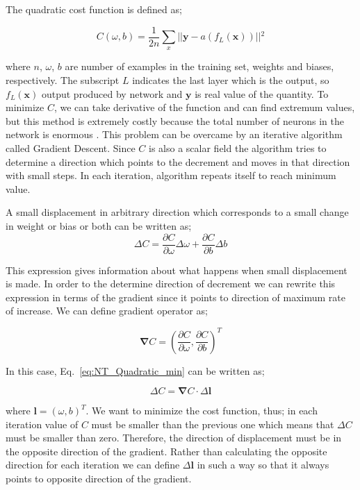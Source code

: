 \documentclass[a4paper,times,hidelinks,12pt]{article}
\begin{document}
The quadratic cost function is defined as;

\begin{equation}
\label{eq:NT_Quadratic}
C(\omega, b) = \frac{1}{2n} \sum\limits_{x} || \boldsymbol{y} - a(f_L(\boldsymbol{x})) ||{^2} 
\end{equation}

\noindent where $n$, $\omega$, $b$ are number of examples in the training set, weights and biases, respectively. The subscript $L$ indicates the last layer which is the output, so $f_L(\boldsymbol{x})$ output produced by network and $\boldsymbol{y}$ is real value of the quantity. To minimize $C$, we can take derivative of the function and can find extremum values, but this method is extremely costly because the total number of neurons in the network is enormous \cite{nielsen2015neural}. This problem can be overcame by an iterative algorithm called Gradient Descent. Since $C$ is also a scalar field the algorithm tries to determine a direction which points to the decrement and moves in that direction with small steps. In each iteration, algorithm repeats itself to reach minimum value. 

A small displacement in arbitrary direction which corresponds to a small change in weight or bias or both can be written as;
\begin{equation}
\label{eq:NT_Quadratic_min}
\Delta{C} = \frac{\partial{C}}{\partial{\omega}}\Delta{\omega} + \frac{\partial{C}}{\partial{b}}\Delta{b}
\end{equation}

\noindent This expression gives information about what happens when small displacement is made. In order to the determine direction of decrement we can rewrite this expression in terms of the gradient since it points to direction of maximum rate of increase. We can define gradient operator as;

\begin{equation}
\label{eq:gradient}
\boldsymbol{\nabla}{C} = \left(\frac{\partial{C}}{\partial{\omega}},\frac{\partial{C}}{\partial{b}} \right)^T
\end{equation}

\noindent In this case, Eq.~\eqref{eq:NT_Quadratic_min} can be written as;

\begin{equation}
\label{eq:NT_Quadratic_min_gradient_form}
\Delta{C} = \boldsymbol{\nabla}{C} \cdot \Delta \boldsymbol{l}
\end{equation}

\noindent where $\boldsymbol{l} = (\omega, b)^T$. We want to minimize the cost function, thus; in each iteration value of $C$ must be smaller than the previous one which means that $\Delta{C}$ must be smaller than zero. Therefore, the direction of displacement must be in the opposite direction of the gradient. Rather than calculating the opposite direction for each iteration we can define $\Delta{\boldsymbol{l}}$ in such a way so that it always points to opposite direction of the gradient.
\end{document}
